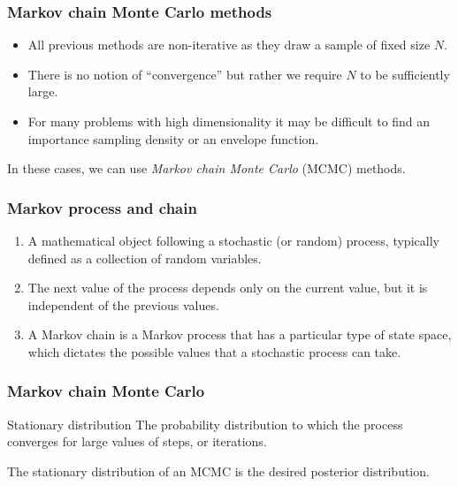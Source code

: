 \documentclass{beamer}
\newcommand{\1}{\ensuremath{\mathbf{1}}}
\begin{document}
%
%
%
\begin{frame}\frametitle{Markov chain Monte Carlo methods}
	\begin{itemize}
		\item All previous methods are non-iterative as they draw a sample of fixed size $N$.
		\item There is no notion of ``convergence'' but rather we require $N$ to be sufficiently large.
		\item For many problems with high dimensionality it may be difficult to find an importance sampling density or an envelope function.
	\end{itemize}
	In these cases, we can use \emph{Markov chain Monte Carlo} (MCMC) methods.
\end{frame}
%
%
%
\begin{frame}\frametitle{Markov process and chain}
	\begin{enumerate}
		\item A mathematical object following a stochastic (or random) process, typically defined as a collection of random variables.
		\item The next value of the process depends only on the current value, but it is independent of the previous values.
		\item A Markov chain is a Markov process that has a particular type of state space, which dictates the possible values that a stochastic process can take.
	\end{enumerate}
\end{frame}
%
%
%
\begin{frame}\frametitle{Markov chain Monte Carlo}
	\begin{block}{Stationary distribution}
		The probability distribution to which the process converges for large values of steps, or iterations.
	\end{block}
	The stationary distribution of an MCMC is the desired posterior distribution.
\end{frame}
\end{document}
